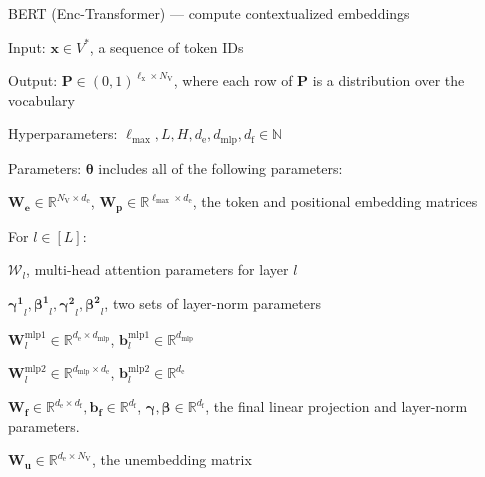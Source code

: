 \documentclass[12pt,aspectratio=169,handout]{beamer}
\begin{document}
\begin{frame}{BERT (Enc-Transformer) --- compute contextualized embeddings}

\begin{minipage}[t][10cm][t]{15cm}

Input: $\bm{x} \in V^*$, a sequence of token IDs

Output: $\bm{P} \in (0,1)^{\ell_{\text{x}} \times N_{\text{V}}}$, where each row of $\bm{P}$ is a distribution over the vocabulary

Hyperparameters: $\ell_{\text{max}}, L, H, d_{\text{e}}, d_{\text{mlp}}, d_{\text{f}} \in \mathbb{N}$

Parameters: $\bm{\theta}$ includes all of the following parameters:

$\bm{W_e} \in \mathbb{R}^{N_\text{V} \times d_\text{e}}$, $\bm{W_p} \in \mathbb{R}^{\ell_{\text{max}} \times d_\text{e}}$, the token and positional embedding matrices

For $l \in [L]$:

$\bm{\mathcal{W}}_l$, multi-head attention parameters for layer $l$

$\bm{\gamma^1}_l, \bm{\beta^1}_l, \bm{\gamma^2}_l, \bm{\beta^2}_l$, two sets of layer-norm parameters

$\bm{W}^{\text{mlp1}}_l \in \mathbb{R}^{d_{\text{e}} \times d_\text{mlp}}$, $\bm{b}^{\text{mlp1}}_l \in \mathbb{R}^{d_\text{mlp}}$

$\bm{W}^{\text{mlp2}}_l \in \mathbb{R}^{d_\text{mlp} \times d_{\text{e}}}$, $\bm{b}^{\text{mlp2}}_l \in \mathbb{R}^{d_\text{e}}$


$\bm{W_f} \in \mathbb{R}^{d_\text{e} \times d_\text{f}}, \bm{b_f} \in \mathbb{R}^{d_\text{f}}$, $\bm{\gamma},\bm{\beta} \in \mathbb{R}^{d_\text{f}}$, the final linear projection and layer-norm parameters.


$\bm{W_u} \in \mathbb{R}^{d_\text{e} \times N_\text{V}}$, the unembedding matrix

\end{minipage}
\end{frame}
\end{document}
